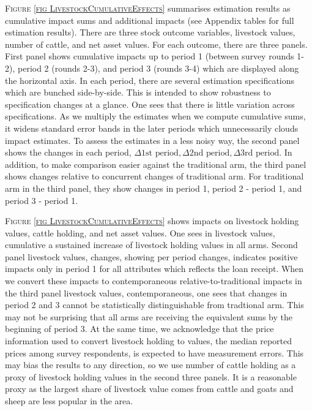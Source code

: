 	\textsc{\footnotesize Figure \ref{fig LivestockCumulativeEffects}} summarises estimation results as cumulative impact sums and additional impacts (see Appendix tables for full estimation results). There are three stock outcome variables, livestock values, number of cattle, and net asset values. For each outcome, there are three panels. First panel shows cumulative impacts up to period 1 (between survey rounds 1-2), period 2 (rounds 2-3), and period 3 (rounds 3-4) which are displayed along the horizontal axis. In each period, there are several estimation specifications which are bunched side-by-side. This is intended to show robustness to specification changes at a glance. One sees that there is little variation across specifications. As we multiply the estimates when we compute cumulative sums, it widens standard error bands in the later periods which unnecessarily clouds impact estimates. To assess the estimates in a less noisy way, the second panel shows the changes in each period, $\Delta\mbox{1st period}, \Delta\mbox{2nd period}, \Delta\mbox{3rd period}$. In addition, to make comparison easier against the \textsf{traditional} arm, the third panel shows changes relative to concurrent changes of \textsf{traditional} arm. For \textsf{traditional} arm in the third panel, they show changes in period 1, period 2 - period 1, and period 3 - period 1.

	\textsc{\footnotesize Figure \ref{fig LivestockCumulativeEffects}} shows impacts on livestock holding values, cattle holding, and net asset values. One sees in \textsf{livestock values, cumulative} a sustained increase of livestock holding values in all arms. Second panel \textsf{livestock values, changes}, showing per period changes, indicates positive impacts only in period 1 for all attributes which reflects the loan receipt. When we convert these impacts to contemporaneous relative-to-\textsf{traditional} impacts in the third panel \textsf{livestock values, contemporaneous}, one sees that changes in period 2 and 3 cannot be statistically distinguishable from \textsf{tradtional} arm. This may not be surprising that all arms are receiving the equivalent sums by the beginning of period 3. At the same time, we acknowledge that the price information used to convert livestock holding to values, the median reported prices among survey respondents, is expected to have measurement errors. This may bias the results to any direction, so we use number of cattle holding as a proxy of livestock holding values in the second three panels. It is a reasonable proxy as the largest share of livestock value comes from cattle and goats and sheep are less popular in the area. 

